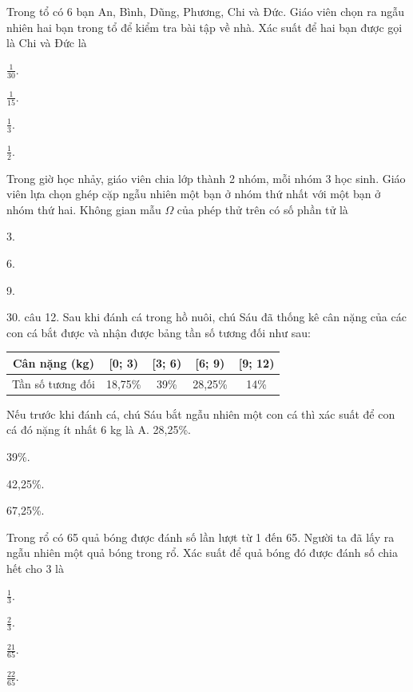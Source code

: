 \documentclass[%
    fontsize=12pt,%
    chapterprefix=false,%
    open=right,%
    twoside=false,%
    numbers=noenddot,%
    headings=optiontohead,%
    final,%
    DIV=15,%
    parskip=half %
]{scrbook}
\begin{document}
\begin{tracnghiem}
\item Trong tổ có 6 bạn An, Bình, Dũng, Phương, Chi và Đức. Giáo viên chọn ra ngẫu nhiên hai bạn trong tổ để kiểm tra bài tập về nhà. Xác suất để hai bạn được gọi là Chi và Đức là
\begin{options}
  \item $\frac{1}{30}$.
  \item $\frac{1}{15}$.
  \item $\frac{1}{3}$.
  \item $\frac{1}{2}$.
\end{options}

\item Trong giờ học nhảy, giáo viên chia lớp thành 2 nhóm, mỗi nhóm 3 học sinh. Giáo viên lựa chọn ghép cặp ngẫu nhiên một bạn ở nhóm thứ nhất với một bạn ở nhóm thứ hai. Không gian mẫu $\Omega$ của phép thử trên có số phần tử là
\begin{options}
  \item 3.
  \item 6.
  \item 9.
  \item 30. câu 12. Sau khi đánh cá trong hồ nuôi, chú Sáu đã thống kê cân nặng của các con cá bắt được và nhận được bảng tần số tương đối như sau: \begin{tabular}{|c|c|c|c|c|} \hline Cân nặng (kg) & [0; 3) & [3; 6) & [6; 9) & [9; 12) \\ \hline Tần số tương đối & 18,75\% & 39\% & 28,25\% & 14\% \\ \hline \end{tabular} Nếu trước khi đánh cá, chú Sáu bắt ngẫu nhiên một con cá thì xác suất để con cá đó nặng ít nhất 6 kg là A. 28,25\%.
  \item 39\%.
  \item 42,25\%.
  \item 67,25\%.
\end{options}

\item Trong rổ có 65 quả bóng được đánh số lần lượt từ 1 đến 65. Người ta đã lấy ra ngẫu nhiên một quả bóng trong rổ. Xác suất để quả bóng đó được đánh số chia hết cho 3 là
\begin{options}
  \item $ \frac{1}{3} $.
  \item $ \frac{2}{3} $.
  \item $ \frac{21}{65} $.
  \item $ \frac{22}{65} $.
\end{options}


\end{tracnghiem}
\end{document}
